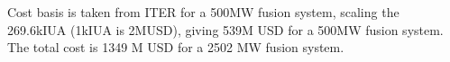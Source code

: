 Cost basis is taken from ITER for a 500MW fusion system, scaling the 269.6kIUA (1kIUA is 2MUSD), giving 539M USD for a 500MW fusion system. The total cost is 1349 M USD for a 2502 MW fusion system.






